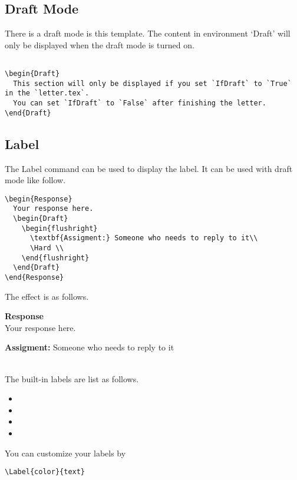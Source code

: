 \printbibliography[heading=none]

\subsection{Draft Mode}

There is a draft mode is this template.
The content in environment `Draft' will only be displayed when the draft mode is turned on.

\begin{verbatim}

\begin{Draft}
  This section will only be displayed if you set `IfDraft` to `True` in the `letter.tex`.
  You can set `IfDraft` to `False` after finishing the letter.
\end{Draft}

\end{verbatim}

\subsection{Label}

The Label command can be used to display the label.
It can be used with draft mode like follow.

\begin{verbatim}
\begin{Response}
  Your response here.
  \begin{Draft}
    \begin{flushright}
      \textbf{Assigment:} Someone who needs to reply to it\\
      \Hard \\
    \end{flushright}
  \end{Draft}
\end{Response}
\end{verbatim}

The effect is as follows.

\begin{framed}
\noindent \textbf{Response}~\\

Your response here.

\begin{flushright}
  \textbf{Assigment:} Someone who needs to reply to it\\
  \Hard \\
\end{flushright}
\end{framed}

The built-in labels are list as follows.
\begin{itemize}
    \item \Hard
    \item \Medium
    \item \Easy
    \item \Done
\end{itemize}

You can customize your labels by
\begin{verbatim}
\Label{color}{text}
\end{verbatim}
